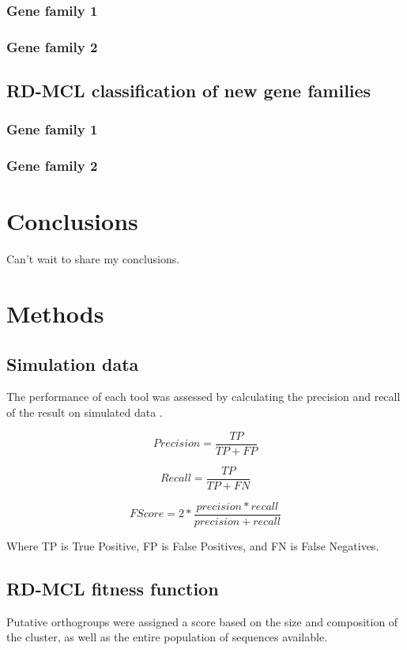 \documentclass[twocolumn]{bmcart}%
\begin{document}
\subsubsection{Gene family 1}
\lipsum[2]

\subsubsection{Gene family 2}
\lipsum[1]

\subsection{RD-MCL classification of new gene families}
\lipsum[1]

\subsubsection{Gene family 1}
\lipsum[2]

\subsubsection{Gene family 2}
\lipsum[1]

\section{Conclusions}
Can't wait to share my conclusions.

\section{Methods}
\subsection{Simulation data}
The performance of each tool was assessed by calculating the precision and recall of the result on simulated data \cite{Emms:2015ig}.

$$
Precision = \frac{TP}{TP + FP}
$$

$$
Recall = \frac{TP}{TP + FN}
$$

$$
F Score = 2 * \frac{precision * recall}{precision + recall}
$$

Where TP is True Positive, FP is False Positives, and FN is False Negatives.

\subsection{RD-MCL fitness function}
Putative orthogroups were assigned a score based on the size and composition of the cluster, as well as the entire population of sequences available.
\end{document}
